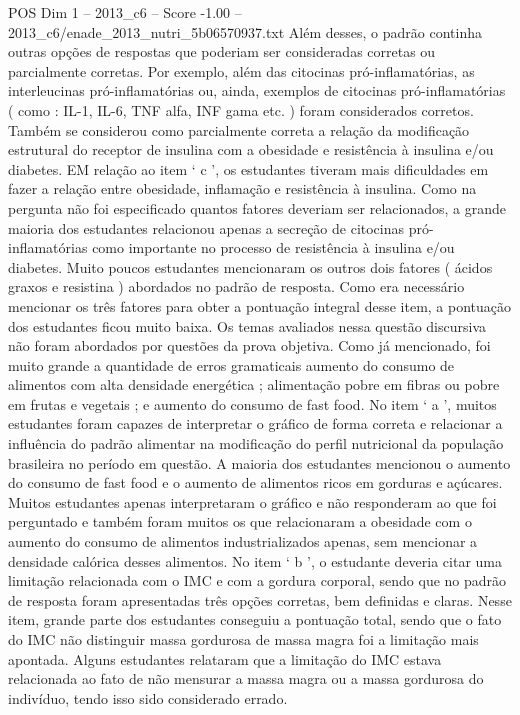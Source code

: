 \begin{textsample}{POS Dim 1 – 2013\_c6 – Score -1.00 – 2013\_c6/enade\_2013\_nutri\_5b06570937.txt}
Além desses, o padrão continha outras opções de respostas que poderiam ser consideradas corretas ou parcialmente corretas.
Por exemplo, além das citocinas pró-inflamatórias, as interleucinas pró-inflamatórias ou, ainda, exemplos de citocinas pró-inflamatórias ( como : IL-1, IL-6, TNF alfa, INF gama etc. ) foram considerados corretos.
Também se considerou como parcialmente correta a relação da modificação estrutural do receptor de insulina com a obesidade e resistência à insulina e/ou diabetes.
EM relação ao item ‘ c ’, os estudantes tiveram mais dificuldades em fazer a relação entre obesidade, inflamação e resistência à insulina.
Como na pergunta não foi especificado quantos fatores deveriam ser relacionados, a grande maioria dos estudantes relacionou apenas a secreção de citocinas pró-inflamatórias como importante no processo de resistência à insulina e/ou diabetes.
Muito poucos estudantes mencionaram os outros dois fatores ( ácidos graxos e resistina ) abordados no padrão de resposta.
Como era necessário mencionar os três fatores para obter a pontuação integral desse item, a pontuação dos estudantes ficou muito baixa.
Os temas avaliados nessa questão discursiva não foram abordados por questões da prova objetiva.
Como já mencionado, foi muito grande a quantidade de erros gramaticais aumento do consumo de alimentos com alta densidade energética ; alimentação pobre em fibras ou pobre em frutas e vegetais ; e aumento do consumo de fast food.
No item ‘ a ’, muitos estudantes foram capazes de interpretar o gráfico de forma correta e relacionar a influência do padrão alimentar na modificação do perfil nutricional da população brasileira no período em questão.
A maioria dos estudantes mencionou o aumento do consumo de fast food e o aumento de alimentos ricos em gorduras e açúcares.
Muitos estudantes apenas interpretaram o gráfico e não responderam ao que foi perguntado e também foram muitos os que relacionaram a obesidade com o aumento do consumo de alimentos industrializados apenas, sem mencionar a densidade calórica desses alimentos.
No item ‘ b ’, o estudante deveria citar uma limitação relacionada com o IMC e com a gordura corporal, sendo que no padrão de resposta foram apresentadas três opções corretas, bem definidas e claras.
Nesse item, grande parte dos estudantes conseguiu a pontuação total, sendo que o fato do IMC não distinguir massa gordurosa de massa magra foi a limitação mais apontada.
Alguns estudantes relataram que a limitação do IMC estava relacionada ao fato de não mensurar a massa magra ou a massa gordurosa do indivíduo, tendo isso sido considerado errado.

\end{textsample}

